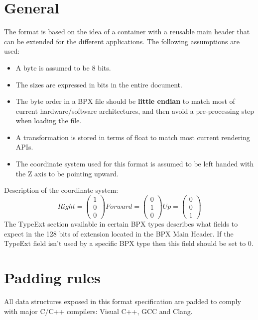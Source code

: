 \section{General}
The format is based on the idea of a container with a reusable main header that can be extended for the different applications.\newline
The following assumptions are used:
\begin{itemize}
    \item A byte is assumed to be 8 bits.
    \item The sizes are expressed in bits in the entire document.
    \item The byte order in a BPX file should be \textbf{little endian} to match most of current hardware/software architectures, and then avoid a pre-processing step when loading the file.
    \item A transformation is stored in terms of float to match most current rendering APIs.
    \item The coordinate system used for this format is assumed to be left handed with the Z axis to be pointing upward.
\end{itemize}
Description of the coordinate system:
\begin{equation}
    Right =
    \begin{pmatrix}
        1 \\
        0 \\
        0
    \end{pmatrix}
    Forward =
    \begin{pmatrix}
        0 \\
        1 \\
        0
    \end{pmatrix}
    Up =
    \begin{pmatrix}
        0 \\
        0 \\
        1
    \end{pmatrix}
\end{equation}
The TypeExt section available in certain BPX types describes what fields to expect in the 128 bits of extension located in the BPX Main Header.\newline
If the TypeExt field isn't used by a specific BPX type then this field should be set to 0.

\section{Padding rules}
All data structures exposed in this format specification are padded to comply with major C/C++ compilers: Visual C++, GCC and Clang.

